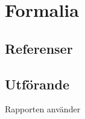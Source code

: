 \section{Formalia} %
\label{sec:formalia}
    \subsection{Referenser} %
    \label{sub:references}
       

    \subsection{Utförande} %
    \label{sub:utforande}
        Rapporten använder
